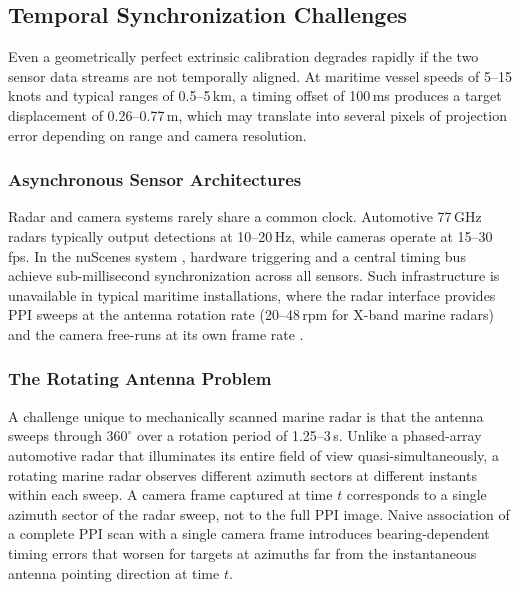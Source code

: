 \subsection{Temporal Synchronization Challenges}\label{sec:time_sync}

Even a geometrically perfect extrinsic calibration degrades rapidly if the two sensor data streams are not temporally aligned. At maritime vessel speeds of 5--15 knots and typical ranges of 0.5--5\,km, a timing offset of 100\,ms produces a target displacement of 0.26--0.77\,m, which may translate into several pixels of projection error depending on range and camera resolution.

\subsubsection{Asynchronous Sensor Architectures}

Radar and camera systems rarely share a common clock. Automotive 77\,GHz radars typically output detections at 10--20\,Hz, while cameras operate at 15--30\,fps. In the nuScenes system \cite{Caesar2020nuScenes}, hardware triggering and a central timing bus achieve sub-millisecond synchronization across all sensors. Such infrastructure is unavailable in typical maritime installations, where the radar interface provides PPI sweeps at the antenna rotation rate (20--48\,rpm for X-band marine radars) and the camera free-runs at its own frame rate \cite{Skolnik2008}.

\subsubsection{The Rotating Antenna Problem}

A challenge unique to mechanically scanned marine radar is that the antenna sweeps through $360^{\circ}$ over a rotation period of 1.25--3\,s. Unlike a phased-array automotive radar that illuminates its entire field of view quasi-simultaneously, a rotating marine radar observes different azimuth sectors at different instants within each sweep. A camera frame captured at time $t$ corresponds to a single azimuth sector of the radar sweep, not to the full PPI image. Naive association of a complete PPI scan with a single camera frame introduces bearing-dependent timing errors that worsen for targets at azimuths far from the instantaneous antenna pointing direction at time $t$.

